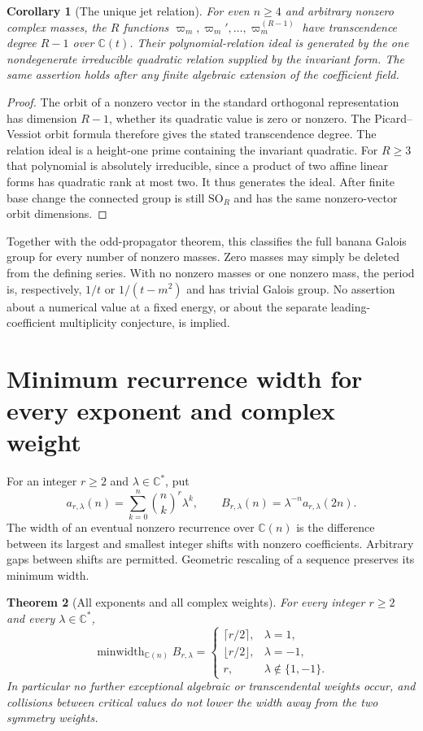 \documentclass[11pt,a4paper]{article}
\newtheorem{theorem}{Theorem}[section]
\newtheorem{corollary}[theorem]{Corollary}
\theoremstyle{definition}
\theoremstyle{remark}
\numberwithin{equation}{section}
\begin{document}
\begin{corollary}[The unique jet relation]\label{p7:be:quadric}
For even $n\geq4$ and arbitrary nonzero complex masses,
the $R$ functions
$\varpi_m,\varpi_m',\ldots,\varpi_m^{(R-1)}$
have transcendence degree $R-1$ over $\mathbb C(t)$.
Their polynomial-relation ideal is generated by the one
nondegenerate irreducible quadratic relation supplied by the
invariant form. The same assertion holds after any finite
algebraic extension of the coefficient field.
\end{corollary}
\begin{proof}
The orbit of a nonzero vector in the standard orthogonal
representation has dimension $R-1$, whether its quadratic
value is zero or nonzero. The Picard--Vessiot orbit formula
therefore gives the stated transcendence degree. The relation
ideal is a height-one prime containing the invariant quadratic.
For $R\geq3$ that polynomial is absolutely irreducible, since
a product of two affine linear forms has quadratic rank at
most two. It thus generates the ideal. After finite base
change the connected group is still $\mathrm{SO}_R$ and
has the same nonzero-vector orbit dimensions.
\end{proof}

Together with the odd-propagator theorem, this classifies the
full banana Galois group for every number of nonzero masses.
Zero masses may simply be deleted from the defining series.
With no nonzero masses or one nonzero mass, the period is,
respectively, $1/t$ or $1/(t-m^2)$ and has trivial Galois group.
No assertion about a numerical value at a fixed energy, or
about the separate leading-coefficient multiplicity conjecture,
is implied.


\clearpage

\section{Minimum recurrence width for every exponent and complex weight}
\label{p7:aw:section}

For an integer $r\ge2$ and $\lambda\in\mathbb C^*$, put
\[
 a_{r,\lambda}(n)=\sum_{k=0}^n\binom nk^r\lambda^k,
 \qquad B_{r,\lambda}(n)=\lambda^{-n}a_{r,\lambda}(2n).
\]
The width of an eventual nonzero recurrence over $\mathbb C(n)$ is
the difference between its largest and smallest integer shifts with
nonzero coefficients. Arbitrary gaps between shifts are permitted.
Geometric rescaling of a sequence preserves its minimum width.

\begin{theorem}[All exponents and all complex weights]
\label{p7:aw:main}
For every integer $r\ge2$ and every $\lambda\in\mathbb C^*$,
\[
 \operatorname{minwidth}_{\mathbb C(n)} B_{r,\lambda}
 =\begin{cases}
 \lceil r/2\rceil,&\lambda=1,\\
 \lfloor r/2\rfloor,&\lambda=-1,\\
 r,&\lambda\notin\{1,-1\}.
 \end{cases}
\]
In particular no further exceptional algebraic or transcendental
weights occur, and collisions between critical values do not lower
the width away from the two symmetry weights.
\end{theorem}
\end{document}
